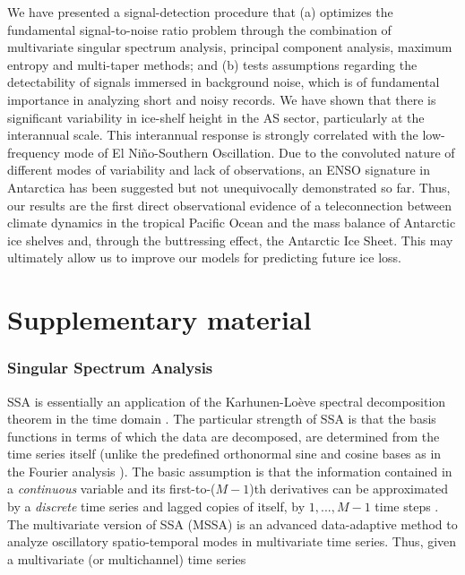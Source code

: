 \noindent
We have presented a signal-detection procedure that (a) optimizes the fundamental signal-to-noise ratio problem through the combination of multivariate singular spectrum analysis, principal component analysis, maximum entropy and multi-taper methods; and (b) tests assumptions regarding the detectability of signals immersed in background noise, which is of fundamental importance in analyzing short and noisy records. We have shown that there is significant variability in ice-shelf height in the AS sector, particularly at the interannual scale. This interannual response is strongly correlated with the low-frequency mode of El Ni\~no-Southern Oscillation. Due to the convoluted nature of different modes of variability and lack of observations, an ENSO signature in Antarctica has been suggested but not unequivocally demonstrated so far. Thus, our results are the first direct observational evidence of a teleconnection between climate dynamics in the tropical Pacific Ocean and the mass balance of Antarctic ice shelves and, through the buttressing effect, the Antarctic Ice Sheet. This may ultimately allow us to improve our models for predicting future ice loss.


\section{Supplementary material}

\subsubsection*{Singular Spectrum Analysis}

\noindent
SSA is essentially an application of the Karhunen-Lo\`eve spectral decomposition theorem in the time domain \parencite[][, and references therein]{Ghil2002}. The particular strength of SSA is that the basis functions in terms of which the data are decomposed, are determined from the time series itself (unlike the predefined orthonormal sine and cosine bases as in the Fourier analysis \parencite{Blackman1958}). The basic assumption is that the information contained in a \emph{continuous} variable and its first-to-($M - 1$)th derivatives can be approximated by a \emph{discrete} time series and lagged copies of itself, by $1,...,M - 1$ time steps \parencite[][chap. 4]{Elsner1996}. The multivariate version of SSA (MSSA) is an advanced data-adaptive method to analyze oscillatory spatio-temporal modes in multivariate time series. Thus, given a multivariate (or multichannel) time series

